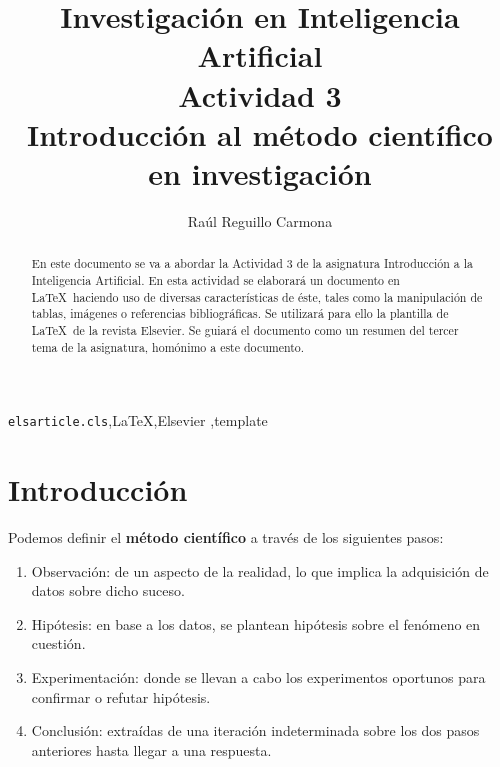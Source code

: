 \documentclass[review]{elsarticle}
\begin{document}
\begin{frontmatter}

\title{Investigaci\'on en Inteligencia Artificial\\Actividad 3\\Introducci\'on al método científico en investigación}

\author{Ra\'ul Reguillo Carmona}


\begin{abstract}
  En este documento se va a abordar la Actividad 3 de la asignatura Introducción a la Inteligencia Artificial. En esta actividad se elaborará un documento en \LaTeX\ haciendo uso de diversas características de éste, tales como la manipulación de tablas, imágenes o referencias bibliográficas. Se utilizará para ello la plantilla de \LaTeX\ de la revista Elsevier. Se guiará el documento como un resumen del tercer tema de la asignatura, homónimo a este documento.  
\end{abstract}

\begin{keyword}
\texttt{elsarticle.cls}\sep \LaTeX\sep Elsevier \sep template
\end{keyword}

\end{frontmatter}

\linenumbers

\section{Introducción}

Podemos definir el \textbf{método científico} a través de los siguientes pasos:

\begin{enumerate}
\item Observación: de un aspecto de la realidad, lo que implica la adquisición de datos sobre dicho suceso.
\item Hipótesis: en base a los datos, se plantean hipótesis sobre el fenómeno en cuestión.
\item Experimentación: donde se llevan a cabo los experimentos oportunos para confirmar o refutar hipótesis.
\item Conclusión: extraídas de una iteración indeterminada sobre los dos pasos anteriores hasta llegar a una respuesta. 
\end{enumerate}
\end{document}

